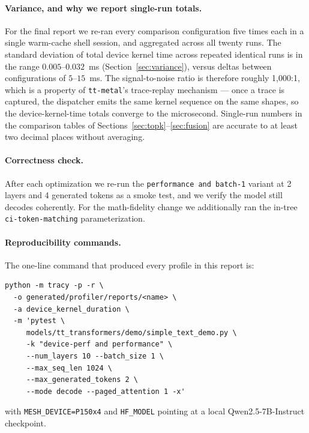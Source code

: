 \documentclass[sigplan,nonacm]{acmart}
\begin{document}
\paragraph{Variance, and why we report single-run totals.} For the
final report we re-ran every comparison configuration five times each
in a single warm-cache shell session, and aggregated across all twenty
runs. The standard deviation of total device kernel time across
repeated identical runs is in the range $0.005\text{--}0.032$~ms
(Section~\ref{sec:variance}), versus deltas between configurations of
$5\text{--}15$~ms. The signal-to-noise ratio is therefore roughly
1{,}000:1, which is a property of \texttt{tt-metal}'s trace-replay
mechanism --- once a trace is captured, the dispatcher emits the same
kernel sequence on the same shapes, so the device-kernel-time totals
converge to the microsecond. Single-run numbers in the comparison
tables of Sections~\ref{sec:topk}--\ref{sec:fusion} are accurate to at
least two decimal places without averaging.

\paragraph{Correctness check.} After each optimization we re-run the
\texttt{performance~and~batch-1} variant at 2 layers and 4 generated
tokens as a smoke test, and we verify the model still decodes
coherently. For the math-fidelity change we additionally ran the
in-tree \texttt{ci-token-matching} parameterization.

\paragraph{Reproducibility commands.} The one-line command that produced
every profile in this report is:

\begin{lstlisting}
python -m tracy -p -r \
  -o generated/profiler/reports/<name> \
  -a device_kernel_duration \
  -m 'pytest \
     models/tt_transformers/demo/simple_text_demo.py \
     -k "device-perf and performance" \
     --num_layers 10 --batch_size 1 \
     --max_seq_len 1024 \
     --max_generated_tokens 2 \
     --mode decode --paged_attention 1 -x'
\end{lstlisting}

\noindent with \texttt{MESH\_DEVICE=P150x4} and
\texttt{HF\_MODEL} pointing at a local Qwen2.5-7B-Instruct checkpoint.

\end{document}
